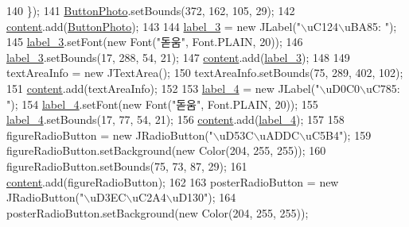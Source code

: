\begin{DoxyCode}
140         \});
141         \hyperlink{classpkg_1_1_product_u_i_a8d114c269e1d1294e82573b7e54e4c54}{ButtonPhoto}.setBounds(372, 162, 105, 29);
142         \hyperlink{classpkg_1_1_product_u_i_a4b906446ebd18ba32a11ace86f26fe12}{content}.add(\hyperlink{classpkg_1_1_product_u_i_a8d114c269e1d1294e82573b7e54e4c54}{ButtonPhoto});
143         
144         \hyperlink{classpkg_1_1_product_u_i_a34869e36c8a05341ad152117c0abd8b5}{label\_3} = \textcolor{keyword}{new} JLabel(\textcolor{stringliteral}{"\(\backslash\)uC124\(\backslash\)uBA85: "});
145         \hyperlink{classpkg_1_1_product_u_i_a34869e36c8a05341ad152117c0abd8b5}{label\_3}.setFont(\textcolor{keyword}{new} Font(\textcolor{stringliteral}{"돋움"}, Font.PLAIN, 20));
146         \hyperlink{classpkg_1_1_product_u_i_a34869e36c8a05341ad152117c0abd8b5}{label\_3}.setBounds(17, 288, 54, 21);
147         \hyperlink{classpkg_1_1_product_u_i_a4b906446ebd18ba32a11ace86f26fe12}{content}.add(\hyperlink{classpkg_1_1_product_u_i_a34869e36c8a05341ad152117c0abd8b5}{label\_3});
148         
149         textAreaInfo = \textcolor{keyword}{new} JTextArea();
150         textAreaInfo.setBounds(75, 289, 402, 102);
151         \hyperlink{classpkg_1_1_product_u_i_a4b906446ebd18ba32a11ace86f26fe12}{content}.add(textAreaInfo);
152         
153         \hyperlink{classpkg_1_1_product_u_i_accc652eee841b5191b1531a9b6eb8c9e}{label\_4} = \textcolor{keyword}{new} JLabel(\textcolor{stringliteral}{"\(\backslash\)uD0C0\(\backslash\)uC785: "});
154         \hyperlink{classpkg_1_1_product_u_i_accc652eee841b5191b1531a9b6eb8c9e}{label\_4}.setFont(\textcolor{keyword}{new} Font(\textcolor{stringliteral}{"돋움"}, Font.PLAIN, 20));
155         \hyperlink{classpkg_1_1_product_u_i_accc652eee841b5191b1531a9b6eb8c9e}{label\_4}.setBounds(17, 77, 54, 21);
156         \hyperlink{classpkg_1_1_product_u_i_a4b906446ebd18ba32a11ace86f26fe12}{content}.add(\hyperlink{classpkg_1_1_product_u_i_accc652eee841b5191b1531a9b6eb8c9e}{label\_4});
157         
158         figureRadioButton = \textcolor{keyword}{new} JRadioButton(\textcolor{stringliteral}{"\(\backslash\)uD53C\(\backslash\)uADDC\(\backslash\)uC5B4"});
159         figureRadioButton.setBackground(\textcolor{keyword}{new} Color(204, 255, 255));
160         figureRadioButton.setBounds(75, 73, 87, 29);
161         \hyperlink{classpkg_1_1_product_u_i_a4b906446ebd18ba32a11ace86f26fe12}{content}.add(figureRadioButton);
162         
163         posterRadioButton = \textcolor{keyword}{new} JRadioButton(\textcolor{stringliteral}{"\(\backslash\)uD3EC\(\backslash\)uC2A4\(\backslash\)uD130"});
164         posterRadioButton.setBackground(\textcolor{keyword}{new} Color(204, 255, 255));

\end{DoxyCode}
